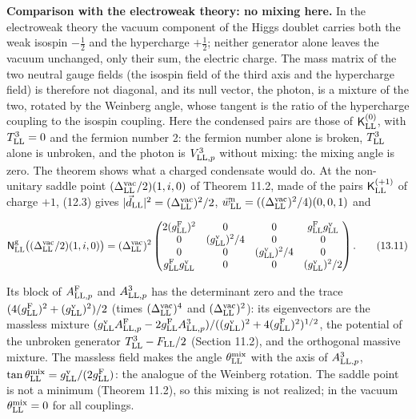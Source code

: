 \documentclass[
  10pt,
]{article}
\begin{document}
\textbf{Comparison with the electroweak theory: no mixing here.} In the
electroweak theory the vacuum component of the Higgs doublet carries
both the weak isospin \(-\tfrac12\) and the hypercharge \(+\tfrac12\);
neither generator alone leaves the vacuum unchanged, only their sum, the
electric charge. The mass matrix of the two neutral gauge fields (the
isospin field of the third axis and the hypercharge field) is therefore
not diagonal, and its null vector, the photon, is a mixture of the two,
rotated by the Weinberg angle, whose tangent is the ratio of the
hypercharge coupling to the isospin coupling. Here the condensed pairs
are those of \(\mathsf K^{(0)}_{\rm LL}\), with \(T^3_{\rm LL}=0\) and
the fermion number 2: the fermion number alone is broken,
\(T^3_{\rm LL}\) alone is unbroken, and the photon is
\(V^3_{{\rm LL},p}\) without mixing: the mixing angle is zero. The
theorem shows what a charged condensate would do. At the non-unitary
saddle point \((\Delta^{\rm vac}_{\rm LL}/2)(1,i,0)\) of Theorem 11.2,
made of the pairs \(\mathsf K^{(+1)}_{\rm LL}\) of charge \(+1\), (12.3)
gives \(\lvert\vec d_{\rm LL}\rvert^2=(\Delta^{\rm vac}_{\rm LL})^2/2\),
\(\vec w^{\rm n}_{\rm LL}=((\Delta^{\rm vac}_{\rm LL})^2/4)(0,0,1)\) and

\[\mathsf N^{\rm g}_{\rm LL}\big((\Delta^{\rm vac}_{\rm LL}/2)(1,i,0)\big)=(\Delta^{\rm vac}_{\rm LL})^2\begin{pmatrix}2(g^{\rm F}_{\rm LL})^2&0&0&g^{\rm F}_{\rm LL}g^{\rm v}_{\rm LL}\\0&(g^{\rm v}_{\rm LL})^2/4&0&0\\0&0&(g^{\rm v}_{\rm LL})^2/4&0\\g^{\rm F}_{\rm LL}g^{\rm v}_{\rm LL}&0&0&(g^{\rm v}_{\rm LL})^2/2\end{pmatrix}.\tag{13.11}\]

Its block of \(A^{\rm F}_{{\rm LL},p}\) and \(A^3_{{\rm LL},p}\) has the
determinant zero and the trace
\((4(g^{\rm F}_{\rm LL})^2+(g^{\rm v}_{\rm LL})^2)/2\) (times
\((\Delta^{\rm vac}_{\rm LL})^4\) and
\((\Delta^{\rm vac}_{\rm LL})^2\)): its eigenvectors are the massless
mixture
\((g^{\rm v}_{\rm LL}A^{\rm F}_{{\rm LL},p}-2g^{\rm F}_{\rm LL}A^3_{{\rm LL},p})/((g^{\rm v}_{\rm LL})^2+4(g^{\rm F}_{\rm LL})^2)^{1/2}\),
the potential of the unbroken generator \(T^3_{\rm LL}-F_{\rm LL}/2\)
(Section 11.2), and the orthogonal massive mixture. The massless field
makes the angle \(\theta^{\rm mix}_{\rm LL}\) with the axis of
\(A^3_{{\rm LL},p}\),
\(\tan\theta^{\rm mix}_{\rm LL}=g^{\rm v}_{\rm LL}/(2g^{\rm F}_{\rm LL})\):
the analogue of the Weinberg rotation. The saddle point is not a minimum
(Theorem 11.2), so this mixing is not realized; in the vacuum
\(\theta^{\rm mix}_{\rm LL}=0\) for all couplings.
\end{document}
